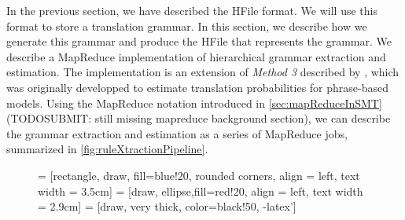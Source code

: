 In the previous section, we have described the HFile format. We will use
this format to store a translation grammar. In this
section, we describe how we generate this grammar and produce the HFile
that represents the grammar.
We describe a MapReduce implementation of hierarchical grammar
extraction and estimation. The implementation is an
extension of \emph{Method 3} described by
\citet{dyer-cordova-mont-lin:2008:WMT}, which was originally developped
to estimate translation probabilities for phrase-based models.
Using the MapReduce notation introduced
in \autoref{sec:mapReduceInSMT} (TODOSUBMIT: still missing mapreduce background section),
we can describe the grammar extraction and estimation
as a series of MapReduce jobs, summarized in
\autoref{fig:ruleXtractionPipeline}.
%
\begin{figure}
   = [rectangle, draw, fill=blue!20, rounded corners,
    align = left, text width = 3.5cm]
   = [draw, ellipse,fill=red!20,
    align = left, text width = 2.9cm]
   = [draw, very thick, color=black!50, -latex']


\end{figure}

